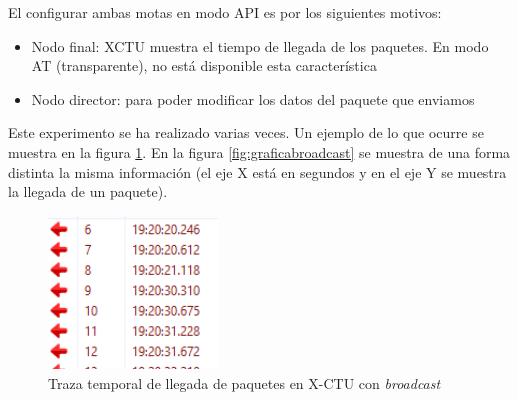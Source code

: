 El configurar ambas motas en modo API es por los siguientes motivos:
\begin{itemize}
  \item Nodo final: XCTU muestra el tiempo de llegada de los paquetes. En modo AT
    (transparente), no está disponible esta característica
  \item Nodo director: para poder modificar los datos del paquete que enviamos
\end{itemize}

Este experimento se ha realizado varias veces. Un ejemplo de lo que ocurre se muestra
en la figura \ref{fig:pruebasxctu_broadcast}. En la figura \ref{fig:graficabroadcast}
se muestra de una forma distinta la misma información (el eje X está en segundos y en
el eje Y se muestra la llegada de un paquete).\\

\begin{figure}[!htb]
\centering
\includegraphics[width=0.4\textwidth]{./imagenes/pruebasxctu_broadcast}
\caption{Traza temporal de llegada de paquetes en X-CTU con \textit{broadcast}} \label{fig:pruebasxctu_broadcast}
\end{figure}


